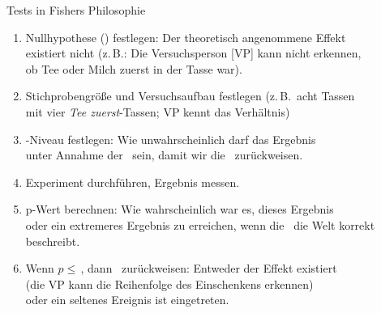 \begin{frame}
  {Tests in Fishers Philosophie}
  \begin{enumerate}
    \item \alert{Nullhypothese} (\Null) festlegen: Der theoretisch angenommene Effekt\\
      existiert \alert{nicht} (z.\,B.: Die Versuchsperson [VP] kann \alert{nicht} erkennen,\\
      ob Tee oder Milch zuerst in der Tasse war).
    \item \alert{Stichprobengröße} und \alert{Versuchsaufbau} festlegen (z.\,B.\ acht Tassen\\
      mit vier \textit{Tee zuerst}-Tassen; VP kennt das Verhältnis)
    \item \alert{\Sig-Niveau} festlegen: Wie unwahrscheinlich darf das Ergebnis\\
      unter Annahme der \Null\ sein, damit wir die \Null\ zurückweisen.
    \item Experiment durchführen, Ergebnis messen.
    \item \alert{p-Wert} berechnen: Wie wahrscheinlich \alert{war} es, dieses Ergebnis\\
      oder ein extremeres Ergebnis zu erreichen, wenn die \Null\ die Welt korrekt beschreibt.
    \item Wenn \alert{$p\leq$\,\Sig}, dann \Null\ zurückweisen: Entweder der Effekt existiert\\
      (\zB die VP kann die Reihenfolge des Einschenkens erkennen)\\
      \alert{oder ein seltenes Ereignis ist eingetreten}.
  \end{enumerate}
\end{frame}


